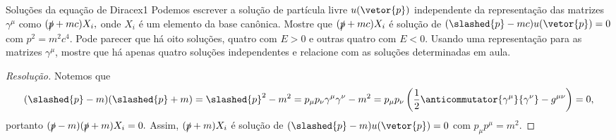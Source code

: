 \begin{exercício}{Soluções da equação de Dirac}{ex1}
    Podemos escrever a solução de partícula livre \(u(\vetor{p})\) independente da representação das matrizes \(\gamma^\mu\) como \((\slashed{p} + mc) X_i,\) onde \(X_i\) é um elemento da base canônica. Mostre que \((\slashed{p} + mc) X_i\) é solução de \((\slashed{p} - mc)u(\vetor{p}) = 0\) com \(p^2 = m^2c^4\). Pode parecer que há oito soluções, quatro com \(E > 0\) e outras quatro com \(E < 0.\) Usando uma representação para as matrizes \(\gamma^\mu\), mostre que há apenas quatro soluções independentes e relacione com as soluções determinadas em aula.
\end{exercício}
\begin{proof}[Resolução]
    Notemos que
    \begin{equation*}
        (\slashed{p} - m)(\slashed{p} + m) = \slashed{p}^2 - m^2 = p_\mu p_\nu \gamma^\mu \gamma^\nu - m^2 = p_{\mu} p_\nu\left(\frac12\anticommutator{\gamma^\mu}{\gamma^\nu} - g^{\mu\nu}\right)  = 0,
    \end{equation*}
    portanto \((\slashed{p} - m)(\slashed{p} + m)X_i = 0.\) Assim, \((\slashed{p} + m)X_i\) é solução de \((\slashed{p} - m) u(\vetor{p}) = 0\) com \(p_\mu p^\mu = m^2.\) 


\end{proof}
